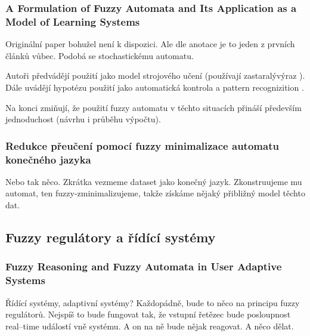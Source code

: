 \documentclass[a4paper,10pt]{article}
\begin{document}
\subsubsection*{A Formulation of Fuzzy Automata and Its Application as a Model of Learning Systems \cite{WeeFu-FormFuzzzAutItsAppModLearSyss}}

Originální paper bohužel není k dispozici. Ale dle anotace je to jeden z prvních článků vůbec. Podobá se stochastickému automatu.

\begin{definition}
\end{definition}

Autoři předvádějí použití  jako model strojového učení (používají zastaralý\RLY výraz ). Dále uvádějí hypotézu použití jako automatická kontrola a pattern recognizition .

Na konci zmiňují, že použití fuzzy automatu v těchto situacích přináší především jednoduchost (návrhu i průběhu výpočtu).

\subsubsection*{Redukce přeučení pomocí fuzzy minimalizace automatu konečného jazyka}
Nebo tak něco. Zkrátka vezmeme dataset jako konečný jazyk. Zkonstruujeme mu automat, ten fuzzy-zminimalizujeme, takže získáme nějaký přibližný model těchto dat.

\subsection{Fuzzy regulátory a řídící systémy}

\subsubsection*{Fuzzy Reasoning and Fuzzy Automata in User Adaptive Systems \cite{Kov-ReasFuzzAutInUsrAdpSyss}}

Řídící systémy, adaptivní systémy? Každopádně, bude to něco na principu fuzzy regulátorů. Nejspíš to bude fungovat tak, že vstupní řetězec bude posloupnost real--time událostí vně systému. A on na ně bude nějak reagovat. A něco dělat.

\begin{definition}
\end{definition}
\end{document}

